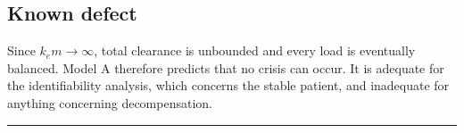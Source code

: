 \subsection{Known defect}

Since $k_e m \to \infty$, total clearance is unbounded and every load is eventually
balanced. Model A therefore predicts that no crisis can occur. It is adequate for the
identifiability analysis, which concerns the stable patient, and inadequate for anything
concerning decompensation.

\vspace{0.5em}
\hrule
\vspace{1em}

